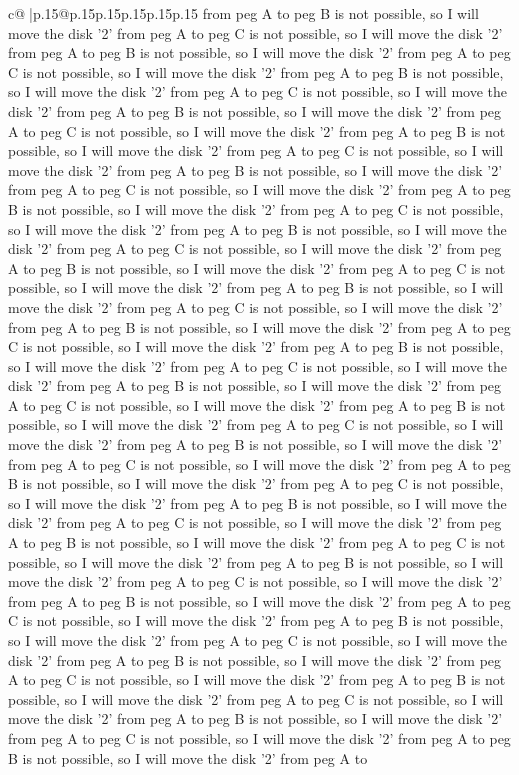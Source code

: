 \documentclass{article}
\begin{document}
{\begin{supertabular}{c@{$\;$}|p{.15\linewidth}@{}p{.15\linewidth}p{.15\linewidth}p{.15\linewidth}p{.15\linewidth}p{.15\linewidth}}
{{{from peg A to peg B is not possible, so I will move the disk '2' from peg A to peg C is not possible, so I will move the disk '2' from peg A to peg B is not possible, so I will move the disk '2' from peg A to peg C is not possible, so I will move the disk '2' from peg A to peg B is not possible, so I will move the disk '2' from peg A to peg C is not possible, so I will move the disk '2' from peg A to peg B is not possible, so I will move the disk '2' from peg A to peg C is not possible, so I will move the disk '2' from peg A to peg B is not possible, so I will move the disk '2' from peg A to peg C is not possible, so I will move the disk '2' from peg A to peg B is not possible, so I will move the disk '2' from peg A to peg C is not possible, so I will move the disk '2' from peg A to peg B is not possible, so I will move the disk '2' from peg A to peg C is not possible, so I will move the disk '2' from peg A to peg B is not possible, so I will move the disk '2' from peg A to peg C is not possible, so I will move the disk '2' from peg A to peg B is not possible, so I will move the disk '2' from peg A to peg C is not possible, so I will move the disk '2' from peg A to peg B is not possible, so I will move the disk '2' from peg A to peg C is not possible, so I will move the disk '2' from peg A to peg B is not possible, so I will move the disk '2' from peg A to peg C is not possible, so I will move the disk '2' from peg A to peg B is not possible, so I will move the disk '2' from peg A to peg C is not possible, so I will move the disk '2' from peg A to peg B is not possible, so I will move the disk '2' from peg A to peg C is not possible, so I will move the disk '2' from peg A to peg B is not possible, so I will move the disk '2' from peg A to peg C is not possible, so I will move the disk '2' from peg A to peg B is not possible, so I will move the disk '2' from peg A to peg C is not possible, so I will move the disk '2' from peg A to peg B is not possible, so I will move the disk '2' from peg A to peg C is not possible, so I will move the disk '2' from peg A to peg B is not possible, so I will move the disk '2' from peg A to peg C is not possible, so I will move the disk '2' from peg A to peg B is not possible, so I will move the disk '2' from peg A to peg C is not possible, so I will move the disk '2' from peg A to peg B is not possible, so I will move the disk '2' from peg A to peg C is not possible, so I will move the disk '2' from peg A to peg B is not possible, so I will move the disk '2' from peg A to peg C is not possible, so I will move the disk '2' from peg A to peg B is not possible, so I will move the disk '2' from peg A to peg C is not possible, so I will move the disk '2' from peg A to peg B is not possible, so I will move the disk '2' from peg A to peg C is not possible, so I will move the disk '2' from peg A to peg B is not possible, so I will move the disk '2' from peg A to peg C is not possible, so I will move the disk '2' from peg A to peg B is not possible, so I will move the disk '2' from peg A to peg C is not possible, so I will move the disk '2' from peg A to peg B is not possible, so I will move the disk '2' from peg A to }}}
\end{supertabular}}
\end{document}
